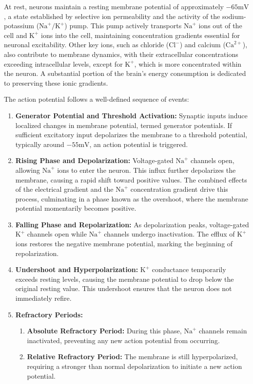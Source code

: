 At rest, neurons maintain a resting membrane potential of approximately $-65 \text{mV}$, a
state established by selective ion permeability and the activity of the sodium-potassium 
($\text{Na}^{+}/\text{K}^{+}$) pump. This pump actively transports $\text{Na}^{+}$ ions 
out of the cell and $\text{K}^{+}$ 
ions into the cell, maintaining concentration gradients essential for neuronal excitability. Other
key ions, such as chloride ($\text{Cl}^{-}$) and calcium ($\text{Ca}^{2+}$), also contribute to membrane dynamics, 
with their extracellular concentrations exceeding intracellular levels, except for $\text{K}^{+}$, which
is more concentrated within the neuron. A substantial portion of the brain's energy
consumption is dedicated to preserving these ionic gradients.

The action potential follows a well-defined sequence of events:

\begin{enumerate}
    \item \textbf{Generator Potential and Threshold Activation:} Synaptic inputs induce localized changes in membrane potential, termed generator potentials. If sufficient excitatory input depolarizes the membrane to a threshold potential, typically around $-55 \text{mV}$, an action potential is triggered.
    \item \textbf{Rising Phase and Depolarization:} Voltage-gated $\text{Na}^{+}$ channels open, allowing $\text{Na}^{+}$ 
    ions to enter the neuron. This influx further depolarizes the membrane, causing a rapid shift toward positive values.
    The combined effects of the electrical gradient and the $\text{Na}^{+}$ concentration gradient drive this process, culminating in a phase known as the overshoot, where the membrane potential momentarily becomes positive.
    \item \textbf{Falling Phase and Repolarization:} As depolarization peaks, voltage-gated $\text{K}^{+}$ channels 
    open while $\text{Na}^{+}$ channels undergo inactivation. The efflux of $\text{K}^{+}$ ions restores the negative membrane potential, marking the beginning of repolarization.
    \item \textbf{Undershoot and Hyperpolarization:} $\text{K}^{+}$ conductance temporarily exceeds resting levels, causing the membrane potential to drop below the original resting value. This undershoot ensures that the neuron does not immediately refire.
    \item \textbf{Refractory Periods:}
    \begin{enumerate}
        \item \textbf{Absolute Refractory Period:} During this phase, $\text{Na}^{+}$ channels remain inactivated, preventing any 
        new action potential from occurring.
        \item \textbf{Relative Refractory Period:} The membrane is still hyperpolarized, requiring a stronger than normal depolarization to initiate a new action potential.
    \end{enumerate}
\end{enumerate}

